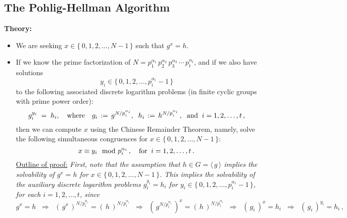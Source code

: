 \subsection{The Pohlig-Hellman Algorithm}

\noindent
\textbf{Theory:}
\begin{itemize}
\item	We are seeking $x \in \{\,0,1,2,\ldots,N-1\,\}$ such that $g^{x} = h$.
\item	If we know the prime factorization of $N = p_{1}^{\alpha_{1}}\,p_{2}^{\alpha_{2}}\,p_{3}^{\alpha_{3}}\,\cdots\,p_{t}^{\alpha_{t}}$,
		and if we also have solutions
		\begin{equation*}
		y_{i} \in \{\,0,1,2,\ldots,p_{i}^{\alpha_{i}}-1\,\}
		\end{equation*}
		to the following associated discrete logarithm problems (in finite cyclic groups with prime power order):
		\begin{equation*}
		g_{i}^{y_{i}} \; = \; h_{i},
		\quad\textnormal{where}\quad g_{i} \, := \, g^{N/p_{i}^{\alpha_{i}}},
		\;\;
		h_{i} \, := \, h^{N/p_{i}^{\alpha_{i}}}\,,
		\;\;\textnormal{and}\;\;
		i = 1,2,\ldots,t\,,
		\end{equation*}
		then we can compute $x$ using the Chinese Remainder Theorem, namely, solve the following simultaneous congruences
		for $x \in \{\,0,1,2,\ldots,N-1\,\}$:
		\begin{equation*}
		x \equiv y_{i}\mod p_{i}^{\alpha_{i}}\,,
		\quad\textnormal{for}\;\; i = 1,2,\ldots,t\,.
		\end{equation*}
		\underline{Outline of proof:}\vskip 0.1cm
		\textit{First, note that the assumption that $h \in G = \langle\,g\,\rangle$ implies
		the solvability of $g^{x} = h$ for $x \in \{\,0,1,2,\ldots,N-1\,\}$.
		This implies the solvability of the auxiliary discrete logarithm problems
		$g_{i}^{y_{i}} = h_{i}$ for $y_{i} \in \{\,0,1,2,\ldots,p_{i}^{\alpha_{i}}-1\,\}$, for each $i = 1,2,\ldots,t$, since
		\begin{equation*}
		g^{x} = h
		\;\;\Longrightarrow\;\; \left(\,g^{x}\,\right)^{N/p_{i}^{\alpha_{i}}} = \left(\,h\,\right)^{N/p_{i}^{\alpha_{i}}}
		\;\;\Longrightarrow\;\; \left(\,g^{N/p_{i}^{\alpha_{i}}}\,\right)^{x} = \left(\,h\,\right)^{N/p_{i}^{\alpha_{i}}}
		\;\;\Longrightarrow\;\; \left(\,g_{i}\,\right)^{x} = h_{i}
		\;\;\Longrightarrow\;\; \left(\,g_{i}\,\right)^{y_{i}} = h_{i}\,,
		\end{equation*}
}
\end{itemize}

